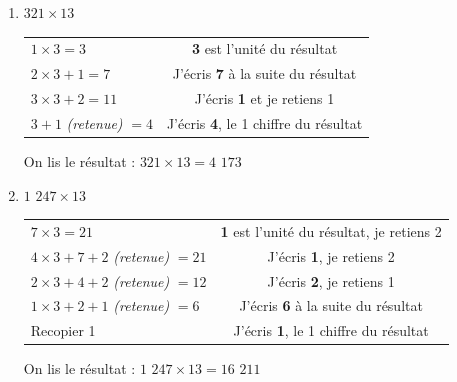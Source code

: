 \documentclass[a4paper, twoside]{article}
\begin{document}
		\begin{small}
		\begin{enumerate}

		\item $321 \times 13$ 

			\begin{tabular}{l|c}

				$1 \times 3 = 3$ & \textbf{3} est l'unité du résultat
				
				\tabularnewline
				
				$2 \times 3 + 1 = 7$ & J'écris \textbf{7} à la suite du résultat
				
				\tabularnewline
				
				$3 \times 3 + 2 = 11$ & J'écris \textbf{1} et je retiens 1
				
				\tabularnewline
				
				$3 + 1$ \textit{(retenue)} $= 4$ & J'écris \textbf{4}, le 1\up{er} chiffre du résultat
				
			\end{tabular}
			
			On lis le résultat : {\boldmath $321 \times 13 = 4$ $173$}\\



			\item $1$ $247 \times 13$

			\begin{tabular}{l|c}

				$7 \times 3 = 21$ & \textbf{1} est l'unité du résultat, je retiens 2
				
				\tabularnewline
				
				$4 \times 3 + 7 + 2$ \textit{(retenue)} $= 21$ & J'écris \textbf{1}, je retiens 2
				
				\tabularnewline
				
				$2 \times 3 + 4 + 2$ \textit{(retenue)} $= 12$ & J'écris \textbf{2}, je retiens 1
				
				\tabularnewline
				
				$1 \times 3 + 2 + 1$ \textit{(retenue)} $= 6$ & J'écris \textbf{6} à la suite du résultat
				
				\tabularnewline
				
				Recopier 1 & J'écris \textbf{1}, le 1\up{er} chiffre du résultat

			\end{tabular}
			
			On lis le résultat : {\boldmath $1$ $247 \times 13 = 16$ $211$}\\

		\end{enumerate}
		\end{small}
\end{document}
